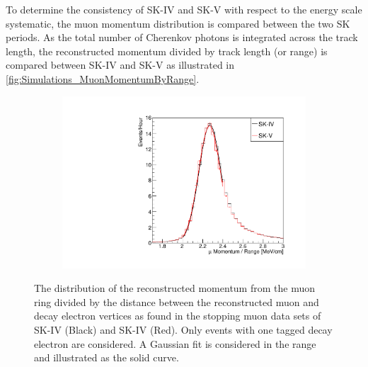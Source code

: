  To determine the consistency of SK-IV and SK-V with respect to the energy scale systematic, the muon momentum distribution is compared between the two SK periods. As the total number of Cherenkov photons is integrated across the track length, the reconstructed momentum divided by track length (or range) is compared between SK-IV and SK-V as illustrated in \autoref{fig:Simulations_MuonMomentumByRange}.

\begin{figure}[h]
  \begin{subfigure}[t]{\textwidth}
    \includegraphics[width=\textwidth, trim={0mm 0mm 0mm 0mm}, clip, page=1]{Figures/Simulations/MuonRangeComparison.pdf}
  \end{subfigure}
  \caption{The distribution of the reconstructed momentum from the muon ring divided by the distance between the reconstructed muon and decay electron vertices as found in the stopping muon data sets of SK-IV (Black) and SK-IV (Red). Only events with one tagged decay electron are considered. A Gaussian fit is considered in the range  and illustrated as the solid curve.}
  \label{fig:Simulations_MuonMomentumByRange}
\end{figure}

